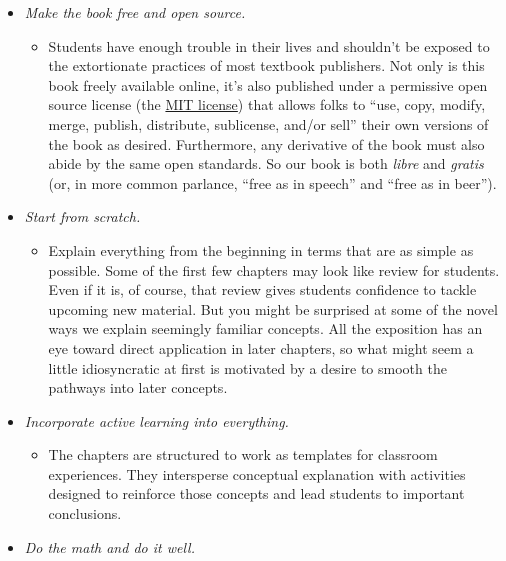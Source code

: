 \documentclass[
]{book}
\providecommand{\tightlist}{%
  \setlength{\itemsep}{0pt}\setlength{\parskip}{0pt}}
\begin{document}
\begin{itemize}
\tightlist
\item
  \emph{Make the book free and open source.}

  \begin{itemize}
  \tightlist
  \item
    Students have enough trouble in their lives and shouldn't be exposed to the extortionate practices of most textbook publishers. Not only is this book freely available online, it's also published under a permissive open source license (the \href{https://opensource.org/licenses/MIT}{MIT license}) that allows folks to ``use, copy, modify, merge, publish, distribute, sublicense, and/or sell'' their own versions of the book as desired. Furthermore, any derivative of the book must also abide by the same open standards. So our book is both \emph{libre} and \emph{gratis} (or, in more common parlance, ``free as in speech'' and ``free as in beer'').
  \end{itemize}
\item
  \emph{Start from scratch.}

  \begin{itemize}
  \tightlist
  \item
    Explain everything from the beginning in terms that are as simple as possible. Some of the first few chapters may look like review for students. Even if it is, of course, that review gives students confidence to tackle upcoming new material. But you might be surprised at some of the novel ways we explain seemingly familiar concepts. All the exposition has an eye toward direct application in later chapters, so what might seem a little idiosyncratic at first is motivated by a desire to smooth the pathways into later concepts.
  \end{itemize}
\item
  \emph{Incorporate active learning into everything.}

  \begin{itemize}
  \tightlist
  \item
    The chapters are structured to work as templates for classroom experiences. They intersperse conceptual explanation with activities designed to reinforce those concepts and lead students to important conclusions.
  \end{itemize}
\item
  \emph{Do the math and do it well.}


\end{itemize}
\end{document}
